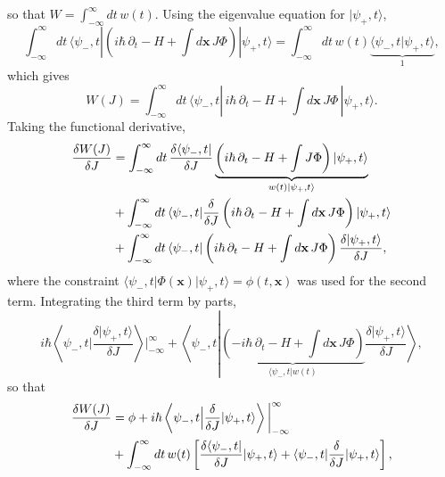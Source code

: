 so that $W = \int_{-\infty}^{\infty}dt\,w(t)$. Using the eigenvalue
equation for $|\psi_+,t\rangle$,
\begin{equation}
	\int_{-\infty}^{\infty}dt\,\langle\psi_-,t|
	\left(i\hbar\,\partial_t - H + \int d\mathbf{x}\,J\Phi\right)|\psi_+,t\rangle
	= \int_{-\infty}^{\infty}dt\,w(t)
	\underbrace{\langle\psi_-,t|\psi_+,t\rangle}_{1},
\end{equation}
which gives
\begin{equation}
	W(J) = \int_{-\infty}^{\infty}dt\,\langle\psi_-,t|\,
	i\hbar\,\partial_t - H + \int d\mathbf{x}\,J\Phi\,|\psi_+,t\rangle.
\end{equation}
Taking the functional derivative,
\begin{align}
	\frac{\delta W(J)}{\delta J} & =
	\int_{-\infty}^{\infty}dt\,\frac{\delta\langle\psi_-,t|}{\delta J}
	\underbrace{\left(i\hbar\,\partial_t - H + \int J\Phi\right)|\psi_+,t\rangle}_{w(t)|\psi_+,t\rangle} \notag \\
	                             & + \int_{-\infty}^{\infty}dt\,\langle\psi_-,t|
	\frac{\delta}{\delta J}\left(i\hbar\,\partial_t - H
	+ \int d\mathbf{x}\,J\Phi\right)|\psi_+,t\rangle \notag                                                     \\
	                             & + \int_{-\infty}^{\infty}dt\,\langle\psi_-,t|
	\left(i\hbar\,\partial_t - H + \int d\mathbf{x}\,J\Phi\right)
	\frac{\delta|\psi_+,t\rangle}{\delta J},
\end{align}
where the constraint $\langle\psi_-,t|\Phi(\mathbf{x})|\psi_+,t\rangle =
	\phi(t,\mathbf{x})$ was used for the second term. Integrating the third
term by parts,
\begin{equation}
	i\hbar\left\langle\psi_-,t\Big|\frac{\delta|\psi_+,t\rangle}{\delta J}
	\right\rangle\bigg|_{-\infty}^{\infty}
	+ \left\langle\psi_-,t\left|
	\underbrace{\left(-i\hbar\,\partial_t - H
		+ \int d\mathbf{x}\,J\Phi\right)}_{\langle\psi_-,t|w(t)}
	\frac{\delta|\psi_+,t\rangle}{\delta J}\right.\right\rangle,
\end{equation}
so that
\begin{align}
	\frac{\delta W(J)}{\delta J} & = \phi
	+ i\hbar\left\langle\psi_-,t\Big|
	\frac{\delta}{\delta J}|\psi_+,t\rangle\right\rangle\bigg|_{-\infty}^{\infty} \notag                                               \\
	                             & + \int_{-\infty}^{\infty}dt\,w(t)\left[
		                                                                \frac{\delta\langle\psi_-,t|}{\delta J}|\psi_+,t\rangle
		                                                                + \langle\psi_-,t|\frac{\delta}{\delta J}|\psi_+,t\rangle\right],
\end{align}

